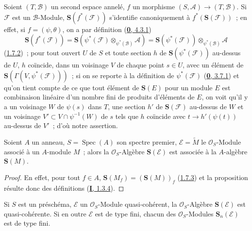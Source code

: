\begin{env}[1.7.5]
\label{II.1.7.5-fr}
Soient $(T,\mathcal{B})$ un second espace annelé, $f$ un morphisme
$(S,\mathcal{A})\to(T,\mathcal{B})$. Si $\mathcal{F}$ est un
$\mathcal{B}$-Module, $\mathbf{S}(f^*(\mathcal{F}))$ s'identifie
canoniquement à $f^*(\mathbf{S}(\mathcal{F}))$~; en effet, si
$f=(\psi,\theta)$, on a par définition
(\hyperref[0.4.3.1-fr]{\textbf{0}, 4.3.1})
\[
  \mathbf{S}(f^*(\mathcal{F}))
  =\mathbf{S}(\psi^*(\mathcal{F})
    \otimes_{\psi^*(\mathcal{B})}\mathcal{A})
  =\mathbf{S}(\psi^*(\mathcal{F}))
    \otimes_{\psi^*(\mathcal{B})}\mathcal{A}
\]
(\hyperref[II.1.7.2-fr]{1.7.2})~; pour tout ouvert $U$ de $S$ et toute
section $h$ de $\mathbf{S}(\psi^*(\mathcal{F}))$ au-dessus de $U$, $h$
coïncide, dans un voisinage $V$ de chaque point $s\in U$, avec un élément de
$\mathbf{S}(\Gamma(V,\psi^*(\mathcal{F})))$~; si on se reporte à la
définition de $\psi^*(\mathcal{F})$
(\hyperref[0.3.7.1-fr]{\textbf{0}, 3.7.1}) et qu'on tient compte de ce que tout élément
de $\mathbf{S}(E)$ pour un module $E$ est combinaison linéaire d'un nombre
fini de produits d'éléments de $E$, on voit qu'il y a un voisinage $W$ de
$\psi(s)$ dans $T$, une section $h'$ de $\mathbf{S}(\mathcal{F})$ au-dessus
de $W$ et un voisinage $V'\subset V\cap\psi^{-1}(W)$ de $s$ tels que $h$
coïncide avec $t\to h'(\psi(t))$ au-dessus de $V'$~; d'où notre
assertion.
\end{env}

\begin{proposition}[1.7.6]
\label{II.1.7.6-fr}
Soient $A$ un anneau, $S=\operatorname{Spec}(A)$ son spectre premier,
$\mathcal{E}=\widetilde{M}$ le $\mathcal{O}_S$-Module associé à un $A$-module
$M$~; alors la $\mathcal{O}_S$-Algèbre $\mathbf{S}(\mathcal{E})$ est associée
à la $A$-algèbre $\mathbf{S}(M)$.
\end{proposition}

\begin{proof}
En effet, pour tout $f\in A$,
$\mathbf{S}(M_f)=(\mathbf{S}(M))_f$
(\hyperref[II.1.7.3-fr]{1.7.3}) et la proposition résulte donc des définitions
(\hyperref[I.1.3.4-fr]{\textbf{I}, 1.3.4}).
\end{proof}

\begin{corollary}[1.7.7]
\label{II.1.7.7-fr}
Si $S$ est un préschéma, $\mathcal{E}$ un $\mathcal{O}_S$-Module
quasi-cohérent, la $\mathcal{O}_S$-Algèbre $\mathbf{S}(\mathcal{E})$ est
quasi-cohérente. Si en outre $\mathcal{E}$ est de type fini, chacun des
$\mathcal{O}_S$-Modules $\mathbf{S}_n(\mathcal{E})$ est de type fini.
\end{corollary}

